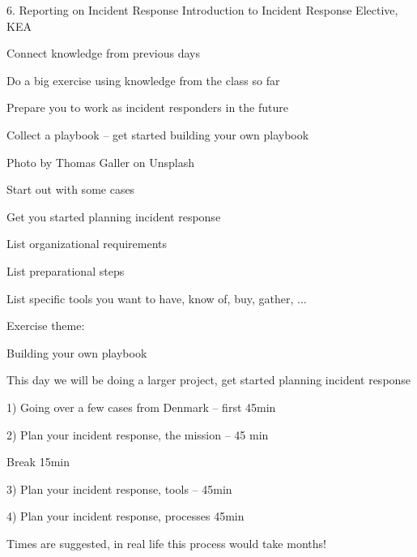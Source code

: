 \documentclass[Screen16to9,17pt]{foils}
\begin{document}
\mytitlepage
{6. Reporting on Incident Response}
{Introduction to Incident Response Elective, KEA}




\begin{list2}
\item Connect knowledge from previous days
\item Do a big exercise using knowledge from the class so far
\item Prepare you to work as incident responders in the future
\item Collect a playbook -- get started building your own playbook
\end{list2}

{\hfill \small Photo by Thomas Galler on Unsplash}


\begin{list2}
\item Start out with some cases
\item Get you started planning incident response
\item List organizational requirements
\item List preparational steps
\item List specific tools you want to have, know of, buy, gather, ...
\end{list2}

Exercise theme:
\begin{list2}
\item Building your own playbook
\end{list2}


This day we will be doing a larger project, get started planning incident response
\begin{list2}
\item 1) Going over a few cases from Denmark -- first 45min
\item 2) Plan your incident response, the mission -- 45 min
\item Break 15min
\item 3) Plan your incident response, tools -- 45min
\item 4) Plan your incident response, processes 45min
\end{list2}

Times are suggested, in real life this process would take months!
\end{document}
